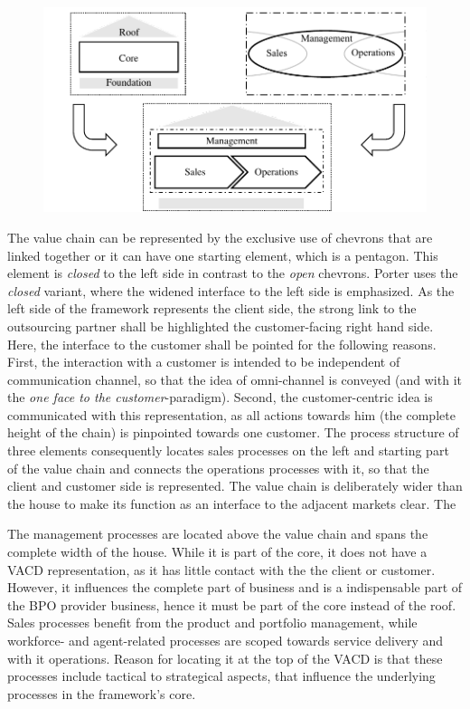 	\begin{figure}[caption={Framework design influences}, label={fig:frameworkdesign}]
		{	\includegraphics[width=.8\textwidth]{figures/frameworkdesign.pdf}}
	\end{figure} 
	
	
	The value chain can be represented by the exclusive use of chevrons that are linked together or it can have one starting element, which is a pentagon. This element is \textit{closed} to the left side in contrast to the \textit{open} chevrons. Porter uses the \textit{closed} variant, where the widened interface to the left side is emphasized. As the left side of the framework represents the client side, the strong link to the outsourcing partner shall be highlighted \wrt the customer-facing right hand side. Here, the interface to the customer shall be pointed for the following reasons. First, the interaction with a customer is intended to be independent of communication channel, so that the idea of omni-channel is conveyed (and with it the \textit{one face to the customer}-paradigm). Second, the customer-centric idea is communicated with this representation, as all actions towards him (the complete height of the chain) is pinpointed towards one customer. The process structure of three elements consequently locates sales processes on the left and starting part of the value chain and connects the operations processes with it, so that the client and customer side is represented. The value chain is deliberately wider than the house to make its function as an interface to the adjacent markets clear. The 
	
	The management processes are located above the value chain and spans the complete width of the house. While it is part of the core, it does not have a \acrshort{VACD} representation, as it has little contact with the the client or customer. However, it influences the complete part of business and is a indispensable part of the \acrshort{BPO} provider business, hence it must be part of the core instead of the roof. Sales processes benefit from the product and portfolio management, while workforce- and agent-related processes are scoped towards service delivery and with it operations. Reason for locating it at the top of the \acrshort{VACD} is that these processes include tactical to strategical aspects, that influence the underlying processes in the framework's core. 
	
